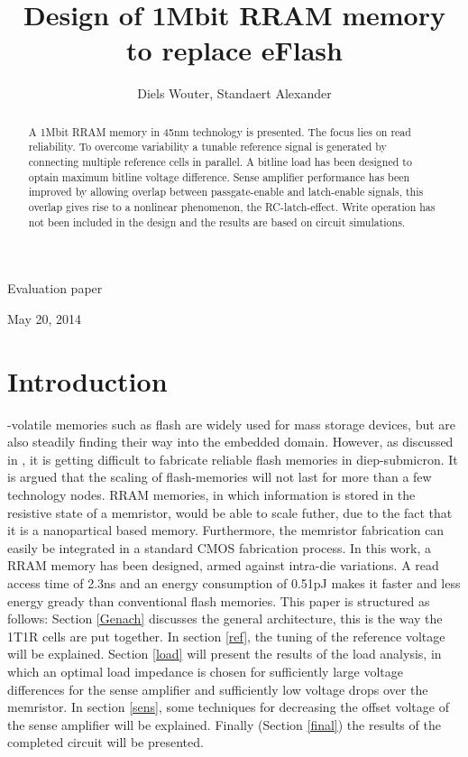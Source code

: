\documentclass[journal]{IEEEtran}
\begin{document}
\title{Design of 1Mbit RRAM memory to replace eFlash}
\author{Diels Wouter, Standaert Alexander}%
%
{Evaluation paper}

\maketitle


\begin{abstract}
A 1Mbit RRAM memory in 45nm technology is presented. The focus lies on read reliability. To overcome variability a tunable reference signal is generated by connecting multiple reference cells in parallel. A bitline load has been designed to optain maximum bitline voltage difference. Sense amplifier performance has been improved by allowing overlap between passgate-enable and latch-enable signals, this overlap gives rise to a nonlinear phenomenon, the RC-latch-effect. Write operation has not been included in the design and the results are based on circuit simulations.
\end{abstract}
\hfill May 20, 2014

\section{Introduction}

-volatile memories such as flash are widely used for mass storage devices, but are also steadily finding their way into the embedded domain. However, as discussed in \cite{Pra10}, it is getting difficult to fabricate reliable flash memories in diep-submicron. It is argued that the scaling of flash-memories will not last for more than a few technology nodes. RRAM memories, in which information is stored in the resistive state of a memristor, would be able to scale futher, due to the fact that it is a nanopartical based memory\cite{rramscaling}. Furthermore, the memristor fabrication can easily be integrated in a standard CMOS fabrication process. In this work, a RRAM memory has been designed, armed against intra-die variations. A read access time of 2.3ns and an energy consumption of 0.51pJ makes it faster and less energy gready than conventional flash memories.
This paper is structured as follows: Section \ref{Genach} discusses the general architecture, this is the way the 1T1R cells are put together. In section \ref{ref}, the tuning of the reference voltage will be explained. Section \ref{load} will present the results of the load analysis, in which an optimal load impedance is chosen for sufficiently large voltage differences for the sense amplifier and sufficiently low voltage drops over the memristor. In section \ref{sens}, some techniques for decreasing the offset voltage of the sense amplifier will be explained. Finally (Section \ref{final}) the results of the completed circuit will be presented.
\end{document}

